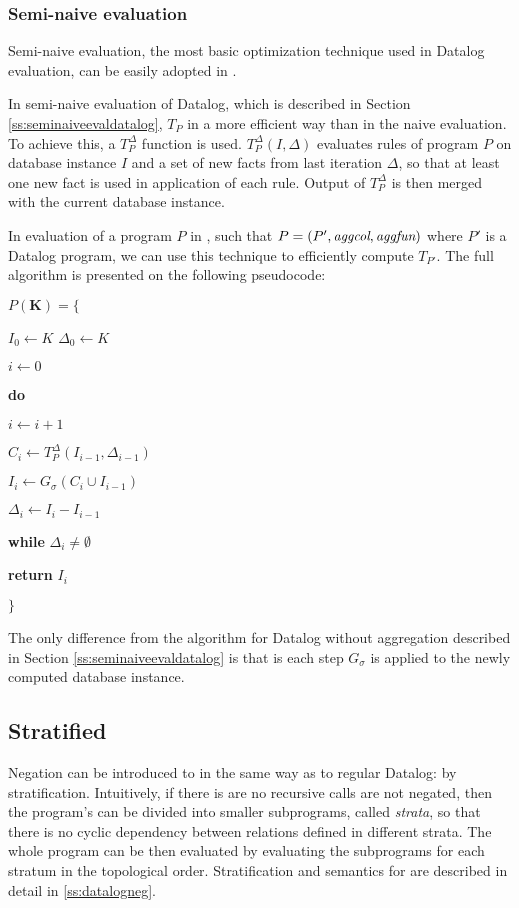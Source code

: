 \subsubsection{Semi-naive evaluation} Semi-naive evaluation, the most basic optimization technique used in Datalog evaluation, can be easily adopted in \datalogra.

In semi-naive evaluation of Datalog, which is described in Section \ref{ss:seminaiveevaldatalog}, $T_P$ in a more efficient way than in the naive evaluation. To achieve this, a $T^\Delta_P$ function is used. $T_P^\Delta(I, \Delta)$ evaluates rules of program $P$ on database instance $I$ and a set of new facts from last iteration $\Delta$, so that at least one new fact is used in application of each rule. Output of $T^\Delta_P$ is then merged with the current database instance.

In evaluation of a program $P$ in \datalogra, such that $P = (P', \textit{aggcol}, \textit{aggfun})$ where $P'$ is a Datalog program, we can use this technique to efficiently compute $T_{P'}$. The full algorithm is presented on the following pseudocode:


\parbox{0.5\textwidth}{
$P(\textbf{K}) = \{$

{\addtolength{\leftskip}{5mm}

$I_0 \leftarrow K$
$\Delta_0 \leftarrow K$

$i \leftarrow 0$

\textbf{do}

{\addtolength{\leftskip}{5mm}

$i \leftarrow i + 1$

$C_i \leftarrow T_P^\Delta(I_{i-1}, \Delta_{i-1})$

$I_i \leftarrow G_\sigma(C_i \cup I_{i-1})$

$\Delta_i \leftarrow I_i - I_{i-1}$

}

\textbf{while} $\Delta_i \ne \emptyset$

\textbf{return} $I_i$

}

$\}$
}

The only difference from the algorithm for Datalog without aggregation described in Section \ref{ss:seminaiveevaldatalog} is that is each step $G_\sigma$ is applied to the newly computed database instance.

\subsection{Stratified \datalogra}
Negation can be introduced to \datalogra in the same way as to regular Datalog: by stratification. Intuitively, if there is are no recursive calls are not negated, then the program's can be divided into smaller subprograms, called \emph{strata}, so that there is no cyclic dependency between relations defined in different strata. The whole program can be then evaluated by evaluating the subprograms for each stratum in the topological order. Stratification and semantics for \datalogneg are described in detail in \ref{ss:datalogneg}.

